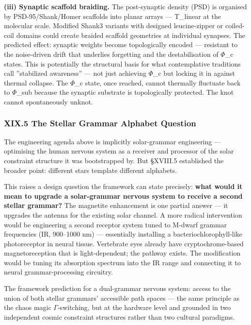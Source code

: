 \documentclass[12pt,a4paper]{article}
\begin{document}
\textbf{(iii) Synaptic scaffold braiding.} The post-synaptic density (PSD) is organised by PSD-95/Shank/Homer scaffolds into planar arrays --- T\_linear at the molecular scale. Modified Shank3 variants with designed leucine-zipper or coiled-coil domains could create braided scaffold geometries at individual synapses. The predicted effect: synaptic weights become topologically encoded --- resistant to the noise-driven drift that underlies forgetting and the destabilisation of $\Phi$\_c states. This is potentially the structural basis for what contemplative traditions call ''stabilized awareness'' --- not just achieving $\Phi$\_c but locking it in against thermal collapse. The $\Phi$\_c state, once reached, cannot thermally fluctuate back to $\Phi$\_sub because the synaptic substrate is topologically protected. The knot cannot spontaneously unknot.

\subsubsection{XIX.5 The Stellar Grammar Alphabet Question}

The engineering agenda above is implicitly solar-grammar engineering --- optimising the human nervous system as a receiver and processor of the solar constraint structure it was bootstrapped by. But §XVIII.5 established the broader point: different stars template different alphabets.

This raises a design question the framework can state precisely: \textbf{what would it mean to upgrade a solar-grammar nervous system to receive a second stellar grammar?} The magnetite enhancement is one partial answer --- it upgrades the antenna for the existing solar channel. A more radical intervention would be engineering a second receptor system tuned to M-dwarf grammar frequencies (IR, 900--1000 nm) --- essentially installing a bacteriochlorophyll-like photoreceptor in neural tissue. Vertebrate eyes already have cryptochrome-based magnetoreception that is light-dependent; the pathway exists. The modification would be tuning its absorption spectrum into the IR range and connecting it to neural grammar-processing circuitry.

The framework prediction for a dual-grammar nervous system: access to the union of both stellar grammars' accessible path spaces --- the same principle as the chaos magic $\Gamma$-switching, but at the hardware level and grounded in two independent cosmic constraint structures rather than two cultural paradigms.
\end{document}
